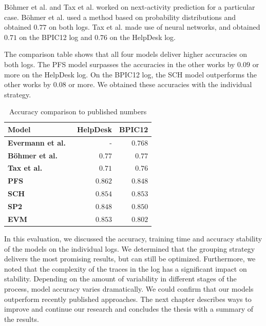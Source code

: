 Böhmer et al. and Tax et al. worked on next-activity prediction for a particular case.
Böhmer et al. used a method based on probability distributions and obtained $0.77$ on both logs.
Tax et al. made use of neural networks, and obtained $0.71$ on the BPIC12 log and $0.76$ on the HelpDesk log.

The comparison table shows that all four models deliver higher accuracies on both logs.
The PFS model surpasses the accuracies in the other works by $0.09$ or more on the HelpDesk log.
On the BPIC12 log, the SCH model outperforms the other works by $0.08$ or more.
We obtained these accuracies with the individual strategy.\\

\begin{table}
\centering
\begin{tabular}{lrr}
\textbf{Model}  &  \textbf{HelpDesk} &  \textbf{BPIC12} \\
\midrule
\textbf{Evermann et al.~\cite{evermann2016}} & - & $0.768$\\
\textbf{Böhmer et al.~\cite{boehmer2018probability}  } & $0.77$ & $0.77$ \\
\textbf{Tax et al.~\cite{tax2017}} & $0.71$ & $0.76$\\
\hline
\textbf{PFS} & $0.862$ & $0.848$ \\
\textbf{SCH} & $0.854$ & $0.853$ \\
\textbf{SP2} & $0.848$ & $0.850$ \\
\textbf{EVM} & $0.853$ & $0.802$ \\
\end{tabular}
\caption{Accuracy comparison to published numbers}
\label{tab:accuracy-comparison}
\end{table}

In this evaluation, we discussed the accuracy, training time and accuracy stability of the models on the individual logs.
We determined that the grouping strategy delivers the most promising results, but can still be optimized.
Furthermore, we noted that the complexity of the traces in the log has a significant impact on stability.
Depending on the amount of variability in different stages of the process, model accuracy varies dramatically.
We could confirm that our models outperform recently published approaches.
The next chapter describes ways to improve and continue our research and concludes the thesis with a summary of the results.
